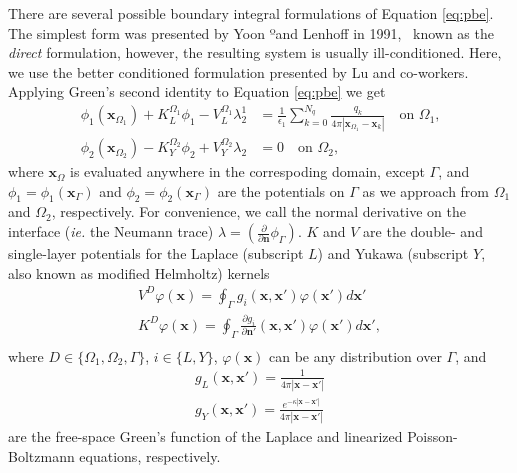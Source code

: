 There are several possible boundary integral formulations of Equation \eqref{eq:pbe}.~\cite{search2022towards} The simplest form was presented by Yoon ºand Lenhoff in 1991,~\cite{YoonLenhoff1990} known as the \emph{direct} formulation, however, the resulting system is usually ill-conditioned. Here, we use the better conditioned formulation presented by Lu and co-workers.~\cite{LuETal2006,LuETal2009,debuhr2016dashmm}
Applying Green's second identity to Equation \eqref{eq:pbe} we get 
%
\begin{align} \label{eq:volume_potential}
\phi_{1}(\mathbf{x}_{\Omega_1})+ K_{L}^{\Omega_1}\phi_1 -  V_{L}^{\Omega_1} \lambda_2^1 & = \tfrac{1}{\epsilon_1} \sum_{k=0}^{N_q}  \frac{q_k}{4\pi|\mathbf{x}_{\Omega_1} - \mathbf{x}_k|}  \quad \text{on $\Omega_1$,} \nonumber \\
\phi_{2}(\mathbf{x}_{\Omega_2}) - K_{Y}^{\Omega_2}\phi_2 + V_{Y}^{\Omega_2} \lambda_2& = 0 \quad \text{on $\Omega_2$,}
\end{align}
%
where $\mathbf{x}_\Omega$ is evaluated anywhere in the correspoding domain, except $\Gamma$, and $\phi_1 = \phi_1(\mathbf{x}_\Gamma)$ and $\phi_2 = \phi_2(\mathbf{x}_\Gamma)$ are the potentials on $\Gamma$ as we approach from $\Omega_1$ and $\Omega_2$, respectively. For convenience, we call the normal derivative on the interface ({\it ie.} the Neumann trace) $\lambda=\left(\frac{\partial}{\partial \mathbf{n}}  \phi_{\Gamma}  \right)$. $K$ and $V$ are the double- and single-layer potentials for the Laplace (subscript $L$) and Yukawa (subscript $Y$, also known as modified Helmholtz) kernels
%
\begin{align}\label{eq:single_double}
V^D \varphi (\mathbf{x}) = \oint_\Gamma g_i(\mathbf{x},\mathbf{x}')\varphi(\mathbf{x}')d\mathbf{x}'\nonumber\\
K^D \varphi (\mathbf{x}) = \oint_\Gamma \frac{\partial g_i}{\partial\mathbf{n}'}(\mathbf{x},\mathbf{x}')\varphi(\mathbf{x}')d\mathbf{x}',\nonumber\\
\end{align}
%
where $D \in \{\Omega_1, \Omega_2, \Gamma\}$, $i \in \{L,Y\}$, $\varphi(\mathbf{x})$ can be any distribution over $\Gamma$, and 
%
\begin{align}\label{eq:green_func}
g_L(\mathbf{x},\mathbf{x}')=\frac{1}{4\pi|\mathbf{x}-\mathbf{x}'|} \nonumber \\
g_Y(\mathbf{x},\mathbf{x}')=\frac{e^{-\kappa|\mathbf{x}-\mathbf{x}'|}}{4\pi|\mathbf{x}-\mathbf{x}'|}
\end{align}
%
are the free-space Green's function of the Laplace and linearized Poisson-Boltzmann equations, respectively. 


